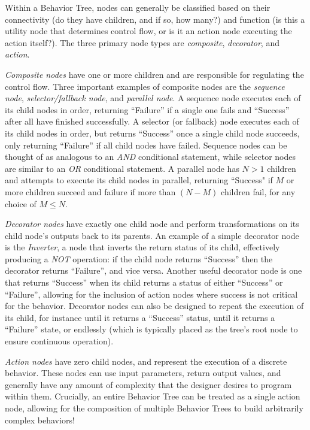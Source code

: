 Within a Behavior Tree, nodes can generally be classified based on their connectivity (do they have children, and if so, how many?) and function (is this a utility node that determines control flow, or is it an action node executing the action itself?). The three primary node types are \textsl{composite}, \textsl{decorator}, and \textsl{action}.

\textsl{Composite nodes} have one or more children and are responsible for regulating the control flow. Three important examples of composite nodes are the \textsl{sequence node}, \textsl{selector/fallback node}, and \textsl{parallel node}. A sequence node executes each of its child nodes in order, returning ``Failure'' if a single one fails and ``Success'' after all have finished successfully. A selector (or fallback) node executes each of its child nodes in order, but returns ``Success'' once a single child node succeeds, only returning ``Failure'' if all child nodes have failed. Sequence nodes can be thought of as analogous to an \textsl{AND} conditional statement, while selector nodes are similar to an \textsl{OR} conditional statement. A parallel node has $N>1$ children and attempts to execute its child nodes in parallel, returning ``Success" if $M$ or more children succeed and failure if more than $(N-M)$ children fail, for any choice of $M\leq N$.

\textsl{Decorator nodes} have exactly one child node and perform transformations on its child node's outputs back to its parents. An example of a simple decorator node is the \textsl{Inverter}, a node that inverts the return status of its child, effectively producing a \textsl{NOT} operation: if the child node returns ``Success'' then the decorator returns ``Failure'', and vice versa. Another useful decorator node is one that returns ``Success'' when its child returns a status of either ``Success'' or ``Failure'', allowing for the inclusion of action nodes where success is not critical for the behavior. Decorator nodes can also be designed to repeat the execution of its child, for instance until it returns a ``Success'' status, until it returns a ``Failure'' state, or endlessly (which is typically placed as the tree's root node to ensure continuous operation).

\textsl{Action nodes} have zero child nodes, and represent the execution of a discrete behavior. These nodes can use input parameters, return output values, and generally have any amount of complexity that the designer desires to program within them. Crucially, an entire Behavior Tree can be treated as a single action node, allowing for the composition of multiple Behavior Trees to build arbitrarily complex behaviors!

